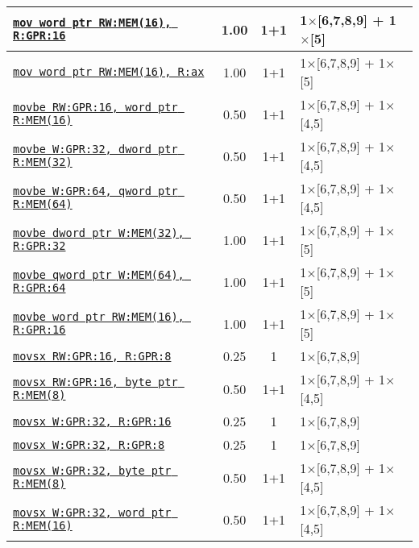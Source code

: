 \documentclass[a4paper,english,fontsize=9]{scrartcl}
\begin{document}
\begin{longtable}{p{}ccL{.25\textwidth}}
  \midrule
  \texttt{\href{https://felixcloutier.com/x86/MOV.html}{mov word ptr RW:MEM(16), R:GPR:16}} & 1.00 & 1+1 & 1\(\times\)[6,7,8,9] + 1\(\times\)[5] \\
  \midrule
  \texttt{\href{https://felixcloutier.com/x86/MOV.html}{mov word ptr RW:MEM(16), R:ax}} & 1.00 & 1+1 & 1\(\times\)[6,7,8,9] + 1\(\times\)[5] \\
  \midrule
  \texttt{\href{https://felixcloutier.com/x86/MOVBE.html}{movbe RW:GPR:16, word ptr R:MEM(16)}} & 0.50 & 1+1 & 1\(\times\)[6,7,8,9] + 1\(\times\)[4,5] \\
  \midrule
  \texttt{\href{https://felixcloutier.com/x86/MOVBE.html}{movbe W:GPR:32, dword ptr R:MEM(32)}} & 0.50 & 1+1 & 1\(\times\)[6,7,8,9] + 1\(\times\)[4,5] \\
  \midrule
  \texttt{\href{https://felixcloutier.com/x86/MOVBE.html}{movbe W:GPR:64, qword ptr R:MEM(64)}} & 0.50 & 1+1 & 1\(\times\)[6,7,8,9] + 1\(\times\)[4,5] \\
  \midrule
  \texttt{\href{https://felixcloutier.com/x86/MOVBE.html}{movbe dword ptr W:MEM(32), R:GPR:32}} & 1.00 & 1+1 & 1\(\times\)[6,7,8,9] + 1\(\times\)[5] \\
  \midrule
  \texttt{\href{https://felixcloutier.com/x86/MOVBE.html}{movbe qword ptr W:MEM(64), R:GPR:64}} & 1.00 & 1+1 & 1\(\times\)[6,7,8,9] + 1\(\times\)[5] \\
  \midrule
  \texttt{\href{https://felixcloutier.com/x86/MOVBE.html}{movbe word ptr RW:MEM(16), R:GPR:16}} & 1.00 & 1+1 & 1\(\times\)[6,7,8,9] + 1\(\times\)[5] \\
  \midrule
  \texttt{\href{https://felixcloutier.com/x86/MOVSX:MOVSXD.html}{movsx RW:GPR:16, R:GPR:8}} & 0.25 & 1 & 1\(\times\)[6,7,8,9] \\
  \midrule
  \texttt{\href{https://felixcloutier.com/x86/MOVSX:MOVSXD.html}{movsx RW:GPR:16, byte ptr R:MEM(8)}} & 0.50 & 1+1 & 1\(\times\)[6,7,8,9] + 1\(\times\)[4,5] \\
  \midrule
  \texttt{\href{https://felixcloutier.com/x86/MOVSX:MOVSXD.html}{movsx W:GPR:32, R:GPR:16}} & 0.25 & 1 & 1\(\times\)[6,7,8,9] \\
  \midrule
  \texttt{\href{https://felixcloutier.com/x86/MOVSX:MOVSXD.html}{movsx W:GPR:32, R:GPR:8}} & 0.25 & 1 & 1\(\times\)[6,7,8,9] \\
  \midrule
  \texttt{\href{https://felixcloutier.com/x86/MOVSX:MOVSXD.html}{movsx W:GPR:32, byte ptr R:MEM(8)}} & 0.50 & 1+1 & 1\(\times\)[6,7,8,9] + 1\(\times\)[4,5] \\
  \midrule
  \texttt{\href{https://felixcloutier.com/x86/MOVSX:MOVSXD.html}{movsx W:GPR:32, word ptr R:MEM(16)}} & 0.50 & 1+1 & 1\(\times\)[6,7,8,9] + 1\(\times\)[4,5] \\

\end{longtable}
\end{document}
